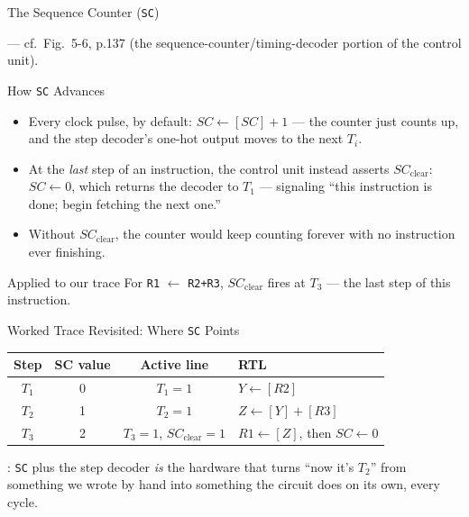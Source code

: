 \documentclass[aspectratio=169]{beamer}
\begin{document}
\begin{frame}{The Sequence Counter (\texttt{SC})}
\begin{center}
  \end{center}
  \footnotesize \cite{Mano1993_computer_system_architecture} --- cf.\ Fig.~5-6, p.137
  (the sequence-counter/timing-decoder portion of the control unit).
\end{frame}

\begin{frame}{How \texttt{SC} Advances}
  \begin{itemize}
    \item Every clock pulse, by default: $SC \gets [SC] + 1$ --- the counter just
      counts up, and the step decoder's one-hot output moves to the next $T_i$.
    \item At the \emph{last} step of an instruction, the control unit instead
      asserts $SC_{\text{clear}}$: $SC \gets 0$, which returns the decoder to $T_1$ ---
      signaling ``this instruction is done; begin fetching the next one.''
    \item Without $SC_{\text{clear}}$, the counter would keep counting forever with no
      instruction ever finishing.
  \end{itemize}
  \begin{exampleblock}{Applied to our trace}
    For \texttt{R1} $\gets$ \texttt{R2+R3}, $SC_{\text{clear}}$ fires at $T_3$ --- the last
    step of this instruction.
  \end{exampleblock}
\end{frame}

\begin{frame}{Worked Trace Revisited: Where \texttt{SC} Points}
  \footnotesize
  \begin{tabular}{@{}cccl@{}}
    \toprule
    \textbf{Step} & \textbf{SC value} & \textbf{Active line} & \textbf{RTL} \\
    \midrule
    $T_1$ & 0 & $T_1=1$ & $Y \gets [R2]$ \\
    $T_2$ & 1 & $T_2=1$ & $Z \gets [Y] + [R3]$ \\
    $T_3$ & 2 & $T_3=1$, $SC_{\text{clear}}=1$ & $R1 \gets [Z]$, then $SC \gets 0$ \\
    \bottomrule
  \end{tabular}
  \vspace{0.3cm}
  : \texttt{SC} plus the step decoder
  \emph{is} the hardware that turns ``now it's $T_2$'' from something we wrote by
  hand into something the circuit does on its own, every cycle.
\end{frame}
\end{document}
